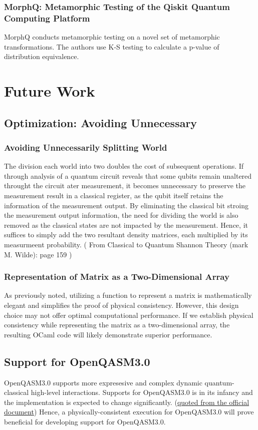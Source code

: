 \documentclass[10pt,a4paper]{article}
\newcommand{\<}{\langle}
\renewcommand{\>}{\rangle}
\begin{document}
\subsubsection{MorphQ: Metamorphic Testing of the Qiskit Quantum Computing Platform}
MorphQ conducts metamorphic testing on a novel set of metamorphic
transformations. The authors use K-S testing to calculate a p-value of
distribution equivalence.

\section{Future Work}
\subsection{Optimization: Avoiding Unnecessary }
\subsubsection{Avoiding Unnecessarily Splitting World}
The division each world into two doubles the cost of subsequent operations.
If through analysis of a quantum circuit reveals that some qubits remain
unaltered throught the circuit ater measurement, it becomes unnecessary to
preserve the measurement result in a classical register, as the qubit itself
retains the information of the measurement output. By eliminating the classical
bit stroing the measurement output information, the need for dividing the world
is also removed as the classical states are not impacted by the measurement.
Hence, it suffices to simply add the two resultant density matrices, each
multiplied by its measurmeent probability.
  ( From Classical to Quantum Shannon Theory (mark M. Wilde): page 159 )

\subsubsection{Representation of Matrix as a Two-Dimensional Array}
As previously noted, utilizing a function to represent a matrix is
mathematically elegant and simplifies the proof of physical consistency.
However, this design choice may not offer optimal computational performance. If
we establish physical consistency while representing the matrix as a
two-dimensional array, the resulting OCaml code will likely demonstrate superior
performance.

\subsection{Support for OpenQASM3.0}
OpenQASM3.0 supports more expresesive and complex dynamic quantum-classical
high-level interactions. Supports for OpenQASM3.0 is
in its infancy and the implementation is expected to change significantly.
(\href{https://qiskit.org/documentation/apidoc/qasm3.html#importing-from-openqasm-3}{quoted
  from the official document}) Hence, a physically-consistent execution for OpenQASM3.0 will prove
beneficial for developing support for OpenQASM3.0.
\end{document}

